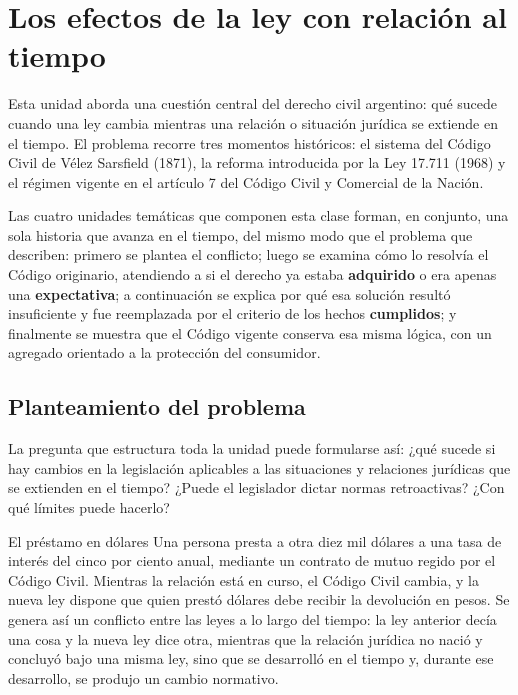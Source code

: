 \documentclass[12pt,oneside]{book}
\begin{document}
\chapter{Los efectos de la ley con relación al tiempo}

Esta unidad aborda una cuestión central del derecho civil argentino: qué sucede cuando una ley cambia mientras una relación o situación jurídica se extiende en el tiempo. El problema recorre tres momentos históricos: el sistema del Código Civil de Vélez Sarsfield (1871), la reforma introducida por la Ley 17.711 (1968) y el régimen vigente en el artículo 7 del Código Civil y Comercial de la Nación.

Las cuatro unidades temáticas que componen esta clase forman, en conjunto, una sola historia que avanza en el tiempo, del mismo modo que el problema que describen: primero se plantea el conflicto; luego se examina cómo lo resolvía el Código originario, atendiendo a si el derecho ya estaba \textbf{adquirido} o era apenas una \textbf{expectativa}; a continuación se explica por qué esa solución resultó insuficiente y fue reemplazada por el criterio de los hechos \textbf{cumplidos}; y finalmente se muestra que el Código vigente conserva esa misma lógica, con un agregado orientado a la protección del consumidor.

\section{Planteamiento del problema}

La pregunta que estructura toda la unidad puede formularse así: ¿qué sucede si hay cambios en la legislación aplicables a las situaciones y relaciones jurídicas que se extienden en el tiempo? ¿Puede el legislador dictar normas retroactivas? ¿Con qué límites puede hacerlo?

\begin{example}{El préstamo en dólares}
Una persona presta a otra diez mil dólares a una tasa de interés del cinco por ciento anual, mediante un contrato de mutuo regido por el Código Civil. Mientras la relación está en curso, el Código Civil cambia, y la nueva ley dispone que quien prestó dólares debe recibir la devolución en pesos. Se genera así un conflicto entre las leyes a lo largo del tiempo: la ley anterior decía una cosa y la nueva ley dice otra, mientras que la relación jurídica no nació y concluyó bajo una misma ley, sino que se desarrolló en el tiempo y, durante ese desarrollo, se produjo un cambio normativo.
\end{example}
\end{document}
